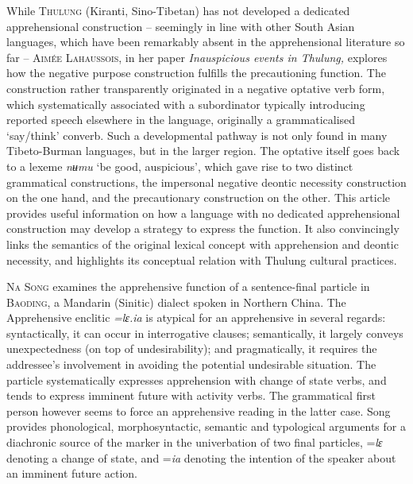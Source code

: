 \documentclass[output=paper,colorlinks,citecolor=brown
]{langscibook}
\begin{document}
While \textsc{Thulung} (Kiranti, Sino-Tibetan) has not developed a dedicated apprehensional construction – seemingly in line with other South Asian languages, which have been remarkably absent in the apprehensional literature so far – \textsc{Aimée} \textsc{Lahaussois}, in her paper \textit{Inauspicious events in Thulung,} explores how the negative purpose construction fulfills the precautioning function. The construction rather transparently originated in a negative optative verb form, which systematically associated with a subordinator typically introducing reported speech elsewhere in the language, originally a grammaticalised `say/think' converb. Such a developmental pathway is not only found in many Tibeto-Burman languages, but in the larger region. The optative itself goes back to a lexeme \textit{nʉmu} {}`be good, auspicious', which gave rise to two distinct grammatical constructions, the impersonal negative deontic necessity construction on the one hand, and the precautionary construction on the other. This article provides useful information on how a language with no dedicated apprehensional construction may develop a strategy to express the function. It also convincingly links the semantics of the original lexical concept with apprehension and deontic necessity, and highlights its conceptual relation with Thulung cultural practices.


\textsc{Na} \textsc{Song} examines the apprehensive function of a sentence-final particle in \textsc{Baoding}, a Mandarin (Sinitic) dialect spoken in Northern China. The Apprehensive enclitic \textit{=lɛ.ia} is atypical for an apprehensive in several regards: syntactically, it can occur in interrogative clauses; semantically, it largely conveys unexpectedness (on top of undesirability); and pragmatically, it requires the addressee's involvement in avoiding the potential undesirable situation. The particle systematically expresses apprehension with change of state verbs, and tends to express imminent future with activity verbs. The grammatical first person however seems to force an apprehensive reading in the latter case. Song provides phonological, morphosyntactic, semantic and typological arguments for a diachronic source of the marker in the univerbation of two final particles, =\textit{lɛ} denoting a change of state, and =\textit{ia} denoting the intention of the speaker about an imminent future action.
\end{document}
